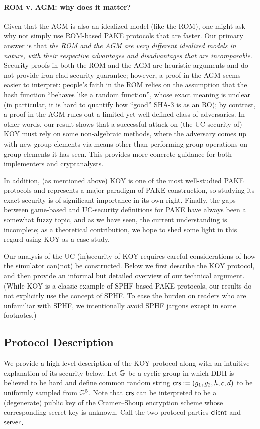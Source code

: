 \paragraph{ROM v. AGM: why does it matter?}
Given that the AGM is also an idealized model (like the ROM), one might ask why not simply use ROM-based PAKE protocols that are faster. Our primary answer is that \emph{the ROM and the AGM are very different idealized models in nature, with their respective advantages and disadvantages that are incomparable}. Security proofs in both the ROM and the AGM are heuristic arguments and do not provide iron-clad security guarantee; however, a proof in the AGM seems easier to interpret: people's faith in the ROM relies on the assumption that the hash function ``behaves like a random function'', whose exact meaning is unclear (in particular, it is hard to quantify how ``good'' SHA-3 is as an RO); by contrast, a proof in the AGM rules out a limited yet well-defined class of adversaries. In other words, our result shows that a successful attack on (the UC-security of) KOY must rely on some non-algebraic methods, where the adversary comes up with new group elements via means other than performing group operations on group elements it has seen. This provides more concrete guidance for both implementers and cryptanalysts.

In addition, (as mentioned above) KOY is one of the most well-studied PAKE protocols and represents a major paradigm of PAKE construction, so studying its exact security is of significant importance in its own right. Finally, the gaps between game-based and UC-security definitions for PAKE have always been a somewhat fuzzy topic, and as we have seen, the current understanding is incomplete; as a theoretical contribution, we hope to shed some light in this regard using KOY as a case study.

Our analysis of the UC-(in)security of KOY requires careful considerations of how the simulator can(not) be constructed. Below we first describe the KOY protocol, and then provide an informal but detailed overview of our technical argument. (While KOY is a classic example of SPHF-based PAKE protocols, our results do not explicitly use the concept of SPHF. To ease the burden on readers who are unfamiliar with SPHF, we intentionally avoid SPHF jargons except in some footnotes.)

\subsection{Protocol Description}
\label{description}
We provide a high-level description of the KOY protocol along with an intuitive explanation of its security below. Let $\mathbb{G}$ be a cyclic group in which DDH is believed to be hard and define common random string $\mathsf{crs} := (g_1, g_2, h, c, d)$ to be uniformly sampled from $\mathbb{G}^5$. Note that $\mathsf{crs}$ can be interpreted to be a (degenerate) public key of the Cramer--Shoup encryption scheme whose corresponding secret key is unknown. Call the two protocol parties $\mathsf{client}$ and $\mathsf{server}$.

